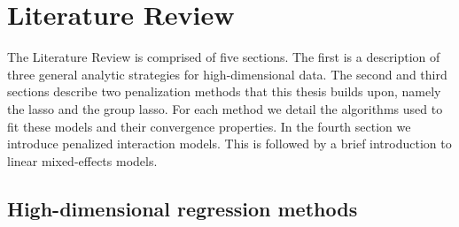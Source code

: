 \chapter{Literature Review\label{ch:litreview}}




\begin{comment}
It is easy to write more than you truly need, so try to keep it as limited as possible.  
(1) The problems of high dimension regressions such as overfitting and redundancy of variables.  
(2) then  penalization generally as a solution to (1).  
You might I suppose mention very briefly the alternative solutions like apriori dimension reduction or forward selection, but I would spend as little time as possible on other methods (acknowledging their existence merely and saying your thesis focuses on penalization).  
(3) then L1 methods including lasso \& group lasso (do you discuss elastic net? if so then you might need to include this too). Here I think you should be quite detailed in terms of the theory, how the penalization parameters are chosen, convergence, etc. 
(4) Then something about other structured L1 penalizations that have been proposed.  There are quite a few examples of penalties built for specific applications, and maybe you could find a few such examples and cite them. Not comprehensively.  Then you can point to the sail chapter as a new structured penalty.  
(5) A brief intro to linear mixed models followed by why naive penalization violates the normality of residuals to motivate your ggmix chapter.    I'd stop there
\end{comment}

The Literature Review is comprised of five sections. The first is a description of three general analytic strategies for high-dimensional data. The second and third sections describe two penalization methods that this thesis builds upon, namely the lasso and the group lasso. 
For each method we detail the algorithms used to fit these models and their convergence properties. In the fourth section we introduce penalized interaction models. This is followed by a brief introduction to linear mixed-effects models.



\section{High-dimensional regression methods}

